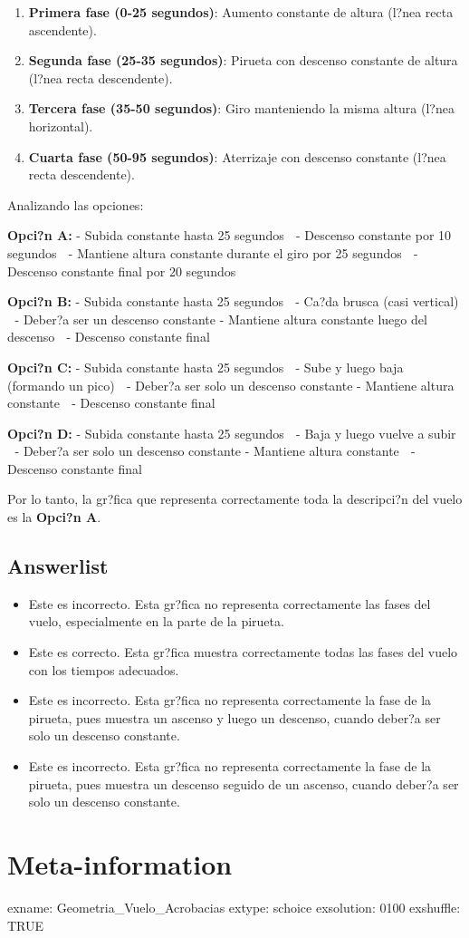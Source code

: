 \documentclass[
]{article}
\providecommand{\tightlist}{%
  \setlength{\itemsep}{0pt}\setlength{\parskip}{0pt}}
\begin{document}
\begin{enumerate}
\def\labelenumi{\arabic{enumi}.}
\tightlist
\item
  \textbf{Primera fase (0-25 segundos)}: Aumento constante de altura
  (l?nea recta ascendente).
\item
  \textbf{Segunda fase (25-35 segundos)}: Pirueta con descenso constante
  de altura (l?nea recta descendente).
\item
  \textbf{Tercera fase (35-50 segundos)}: Giro manteniendo la misma
  altura (l?nea horizontal).
\item
  \textbf{Cuarta fase (50-95 segundos)}: Aterrizaje con descenso
  constante (l?nea recta descendente).
\end{enumerate}

Analizando las opciones:

\textbf{Opci?n A:} - Subida constante hasta 25 segundos  - Descenso
constante por 10 segundos  - Mantiene altura constante durante el giro
por 25 segundos  - Descenso constante final por 20 segundos 

\textbf{Opci?n B:} - Subida constante hasta 25 segundos  - Ca?da brusca
(casi vertical)  - Deber?a ser un descenso constante - Mantiene altura
constante luego del descenso  - Descenso constante final 

\textbf{Opci?n C:} - Subida constante hasta 25 segundos  - Sube y luego
baja (formando un pico)  - Deber?a ser solo un descenso constante -
Mantiene altura constante  - Descenso constante final 

\textbf{Opci?n D:} - Subida constante hasta 25 segundos  - Baja y luego
vuelve a subir  - Deber?a ser solo un descenso constante - Mantiene
altura constante  - Descenso constante final 

Por lo tanto, la gr?fica que representa correctamente toda la
descripci?n del vuelo es la \textbf{Opci?n A}.

\subsection{Answerlist}\label{answerlist-1}

\begin{itemize}
\tightlist
\item
  Este es incorrecto. Esta gr?fica no representa correctamente las fases
  del vuelo, especialmente en la parte de la pirueta.
\item
  Este es correcto. Esta gr?fica muestra correctamente todas las fases
  del vuelo con los tiempos adecuados.
\item
  Este es incorrecto. Esta gr?fica no representa correctamente la fase
  de la pirueta, pues muestra un ascenso y luego un descenso, cuando
  deber?a ser solo un descenso constante.
\item
  Este es incorrecto. Esta gr?fica no representa correctamente la fase
  de la pirueta, pues muestra un descenso seguido de un ascenso, cuando
  deber?a ser solo un descenso constante.
\end{itemize}

\section{Meta-information}\label{meta-information}

exname: Geometria\_Vuelo\_Acrobacias extype: schoice exsolution: 0100
exshuffle: TRUE
\end{document}
